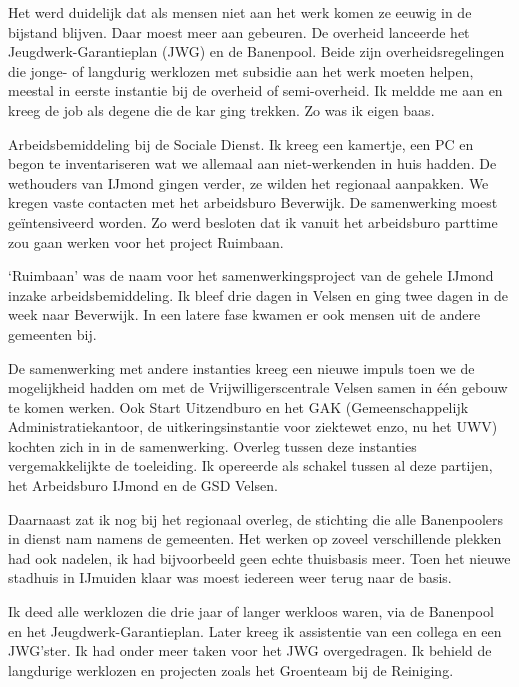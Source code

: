 \documentclass[12pt,twoside, openright]{memoir}
\begin{document}
Het werd duidelijk dat als mensen niet aan het werk komen ze eeuwig in de bijstand blijven. Daar moest meer aan gebeuren. De overheid lanceerde het Jeugdwerk-Garantieplan (JWG) en de Banenpool. Beide zijn overheidsregelingen  die jonge- of langdurig werklozen met subsidie aan het werk moeten helpen, meestal in eerste instantie bij de overheid of semi-overheid. Ik meldde me aan en kreeg de job als degene die de kar ging trekken. Zo was ik eigen baas. 

Arbeidsbemiddeling bij de Sociale Dienst. Ik kreeg een kamertje, een PC en begon te inventariseren wat we allemaal aan niet-werkenden in huis hadden. De wethouders van IJmond gingen verder, ze wilden het regionaal aanpakken. We kregen vaste contacten met het arbeidsburo Beverwijk. De samenwerking moest geïntensiveerd worden. Zo werd besloten dat ik vanuit het arbeidsburo parttime zou gaan werken voor het project Ruimbaan.

`Ruimbaan' was de naam voor het samenwerkingsproject van de gehele IJmond inzake arbeidsbemiddeling. Ik bleef drie dagen in Velsen en ging twee dagen in de week naar Beverwijk. In een latere fase kwamen er ook mensen uit de andere gemeenten bij. 

De samenwerking met andere instanties kreeg een nieuwe impuls toen we de mogelijkheid hadden om met de Vrijwilligerscentrale Velsen samen in één gebouw te komen werken. Ook Start Uitzendburo en het GAK (Gemeenschappelijk Administratiekantoor, de uitkeringsinstantie voor ziektewet enzo, nu het UWV) kochten zich in in de samenwerking. Overleg tussen deze instanties vergemakkelijkte de toeleiding. Ik opereerde als schakel tussen al deze partijen, het Arbeidsburo IJmond en de GSD Velsen. 

Daarnaast zat ik nog bij het regionaal overleg, de stichting die alle Banenpoolers in dienst nam namens de gemeenten. Het werken op zoveel verschillende plekken had ook nadelen, ik had bijvoorbeeld geen echte thuisbasis meer. Toen het nieuwe stadhuis in IJmuiden klaar was moest iedereen weer terug naar de basis. 

Ik deed alle werklozen die drie jaar of langer werkloos waren, via de Banenpool en het Jeugdwerk-Garantieplan. Later kreeg ik assistentie van een collega en een JWG’ster. Ik had onder meer taken voor het JWG overgedragen. Ik behield de langdurige werklozen en projecten zoals het Groenteam bij de Reiniging. 
\end{document}
